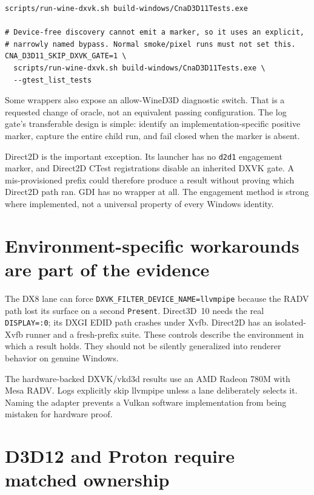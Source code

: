 \begin{lstlisting}[style=cnashell]
scripts/run-wine-dxvk.sh build-windows/CnaD3D11Tests.exe

# Device-free discovery cannot emit a marker, so it uses an explicit,
# narrowly named bypass. Normal smoke/pixel runs must not set this.
CNA_D3D11_SKIP_DXVK_GATE=1 \
  scripts/run-wine-dxvk.sh build-windows/CnaD3D11Tests.exe \
  --gtest_list_tests
\end{lstlisting}

Some wrappers also expose an allow-WineD3D diagnostic switch. That is a requested change of
oracle, not an equivalent passing configuration. The log gate's transferable design is simple:
identify an implementation-specific positive marker, capture the entire child run, and fail
closed when the marker is absent.

Direct2D is the important exception. Its launcher has no \texttt{d2d1} engagement marker, and
Direct2D CTest registrations disable an inherited DXVK gate. A mis-provisioned prefix could
therefore produce a result without proving which Direct2D path ran. GDI has no wrapper at all.
The engagement method is strong where implemented, not a universal property of every Windows
identity.

\section{Environment-specific workarounds are part of the evidence}

The DX8 lane can force \texttt{DXVK\_FILTER\_DEVICE\_NAME=llvmpipe} because the RADV path lost
its surface on a second \texttt{Present}. Direct3D~10 needs the real \texttt{DISPLAY=:0}; its
DXGI EDID path crashes under Xvfb. Direct2D has an isolated-Xvfb runner and a fresh-prefix suite.
These controls describe the environment in which a result holds. They should not be silently
generalized into renderer behavior on genuine Windows.

The hardware-backed DXVK/vkd3d results use an AMD Radeon 780M with Mesa RADV. Logs explicitly
skip llvmpipe unless a lane deliberately selects it. Naming the adapter prevents a Vulkan
software implementation from being mistaken for hardware proof.

\section{D3D12 and Proton require matched ownership}
\label{sec:proton-wrinkle}

